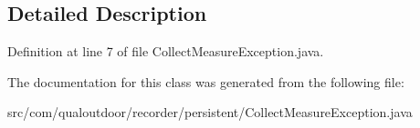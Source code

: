 \subsection{Detailed Description}


Definition at line 7 of file Collect\-Measure\-Exception.\-java.



The documentation for this class was generated from the following file\-:\begin{DoxyCompactItemize}
\item 
src/com/qualoutdoor/recorder/persistent/Collect\-Measure\-Exception.\-java\end{DoxyCompactItemize}

